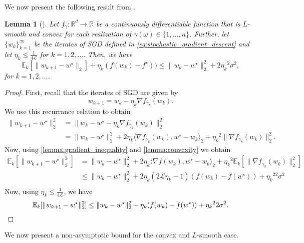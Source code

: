 \documentclass[12pt]{article}
\newtheorem{lemma}[lemma]{Lemma}
\theoremstyle{definition}
\numberwithin{equation}{section}
\newcommand{\R}{\mathbb{R}}
\newcommand{\E}{\mathbb{E}}
\newcommand{\CL}{\mathcal{L}}
\newcommand{\norm}[1]{\lVert{#1}\rVert_2}
\newcommand{\scp}[2]{\langle{#1}, {#2}\rangle_2}
\begin{document}
We now present the following result from \autocite{sebbouhAlmostSureConvergence2021}.
\begin{lemma}[]
  \label{lemma:sgd_iterates}
  Let $f_{\gamma} : \R^d \rightarrow \R$ be a continuously differentiable function that is $L$-smooth and convex for each realization of $\gamma(\omega) \in \{1,\dots,n\}$. Further, let $\{w_{k}\}_{k=1}^{\infty}$ be the iterates of SGD defined in \eqref{eq:stochastic_gradient_descent} and let $\eta_k \leq \frac{1}{4 \CL}$ for $k=1,2,\dots$. Then, we have
  \begin{equation*}
    \E_k[\norm{w_{k+1} - w^\star}] + \eta_k (f(w_{k}) - f^\star)) \leq \norm{w_{k} - w^\star}^2 + 2{\eta_k}^2\sigma^2,
  \end{equation*}
  for $k=1,2,\dots$.
\end{lemma}
\begin{proof}
  First, recall that the iterates of SGD are given by
  \begin{equation*}
    w_{k+1} = w_{k} - \eta_k \nabla f_{\gamma_k}(w_{k}).
  \end{equation*}
  We use this recurrance relation to obtain
  \begin{align*}
    \norm{w_{k+1} - w^\star}^2 &= \norm{w_{k} - w^\star - \eta_k \nabla f_{\gamma_k}(w_{k})}^2 \\
    &= \norm{w_{k} - w^\star}^2 + 2 \eta_k \scp{\nabla f_{\gamma_k}(w_{k})}{ w^\star - w_{k}} + {\eta_k}^2\norm{\nabla f_{\gamma_k}(w_{k})}^2.
  \end{align*}
  Now, using \autoref{lemma:gradient_inequality} and \autoref{lemma:convexity} we obtain
  \begin{align*}
    \E_k[\norm{w_{k+1} - w^\star}^2] &= \norm{w_{k} - w^\star}^2 + 2 \eta_k \scp{\nabla f(w_{k})}{w^\star - w_{k}}+ {\eta_k}^2\E_k[\norm{\nabla f_{\gamma_k}(w_{k})}^2] \\
    &\leq \norm{w_{k} - w^\star}^2 + 2 \eta_k(2\CL \eta_k - 1)(f(w_{k}) - f(w^\star))+ {\eta_k}^22\sigma^2 \\
  \end{align*}
  Now, using $\eta_k \leq \frac{1}{4 \CL}$, we have
  \begin{equation*}
    \E_k[\norm{w_{k+1} - w^\star}^2] \leq \norm{w_{k} - w^\star}^2 - \eta_k(f(w_{k}) - f(w^\star))+ {\eta_k}^22\sigma^2. \qedhere
  \end{equation*}
\end{proof}
We now present a non-asymptotic bound for the convex and $L$-smooth case.
\end{document}
